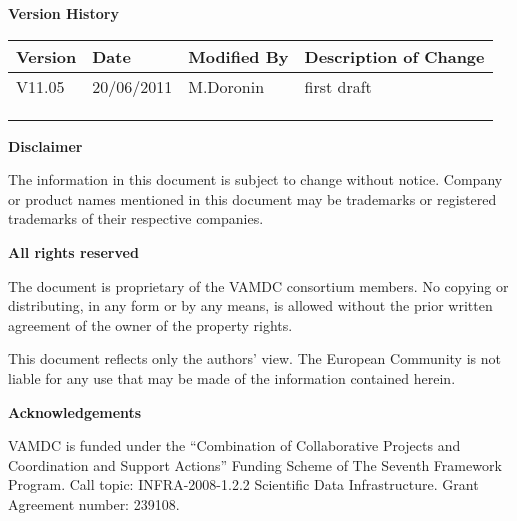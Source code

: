 {\begin{titlepage}
\end{titlepage}

\noindent \textbf{Version History}

\textbf{}

\noindent \begin{tabular}{|l|l|l|l|} 
\hline 
\textbf{Version} & \textbf{Date} & \textbf{Modified By} & \textbf{Description of Change} \\ \hline 
V11.05  & 20/06/2011 &  M.Doronin & first draft \\ \hline 
 &  &  &  \\ \hline 
 &  &  &  \\ \hline 
 &  &  &  \\ \hline 
\end{tabular}

\textbf{}

\noindent \textbf{Disclaimer}

\noindent The information in this document is subject to change without notice. Company or product names mentioned in this document may be trademarks or registered trademarks of their respective companies.


\textbf{}

\noindent \textbf{All rights reserved}

\noindent The document is proprietary of the VAMDC consortium members. No copying or distributing, in any form or by any means, is allowed without the prior written agreement of the owner of the property rights.

\noindent 

\noindent This document reflects only the authors' view. The European Community is not liable for any use that may be made of the information contained herein.

\textbf{}

\noindent \textbf{Acknowledgements}

\noindent VAMDC is funded under the ``Combination of Collaborative Projects and Coordination and  Support Actions'' Funding Scheme of The Seventh Framework Program. Call topic: INFRA-2008-1.2.2 Scientific Data Infrastructure. Grant Agreement number: 239108.

\textbf{}

}